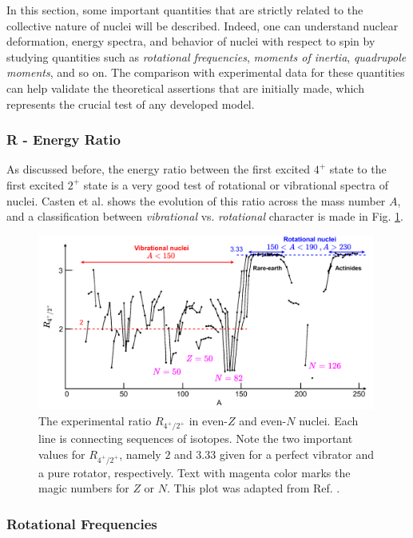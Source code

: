 In this section, some important quantities that are strictly related to the collective nature of nuclei will be described. Indeed, one can understand nuclear deformation, energy spectra, and behavior of nuclei with respect to spin by studying quantities such as \emph{rotational frequencies}, \emph{moments of inertia}, \emph{quadrupole moments}, and so on. The comparison with experimental data for these quantities can help validate the theoretical assertions that are initially made, which represents the crucial test of any developed model.

\subsubsection{R - Energy Ratio}

As discussed before, the energy ratio between the first excited $4^+$ state to the first excited $2^+$ state is a very good test of rotational or vibrational spectra of nuclei. Casten et al. \cite{casten2000nuclear} shows the evolution of this ratio across the mass number $A$, and a classification between \emph{vibrational} vs. \emph{rotational} character is made in Fig. \ref{4state-2state-ratio}.
\begin{figure}
    \centering
    \includegraphics[width=0.99\textwidth]{Chapters/Figures/vibrations_rotations_E42-ratio.pdf}
    \caption{The experimental ratio $R_{4^+/2^+}$ in even-$Z$ and even-$N$ nuclei. Each line is connecting sequences of isotopes. Note the two important values for $R_{4^+/2^+}$, namely $2$ and $3.33$ given for a perfect vibrator and a pure rotator, respectively. Text with magenta color marks the magic numbers for $Z$ or $N$. This plot was adapted from Ref. \cite{casten2000nuclear}.}
    \label{4state-2state-ratio}
\end{figure}

\subsubsection{Rotational Frequencies}

